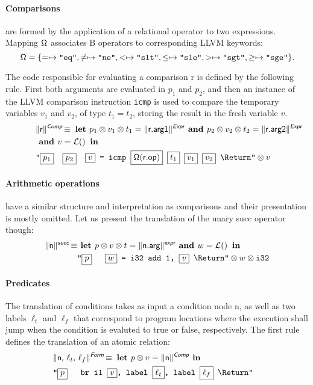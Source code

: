 \documentclass{llncs}
\newcommand{\trad}[2]{\ensuremath{\lVert \textsf{#1} \rVert^{\textit{#2}}}}
\newcommand{\nl}[0]{\text{\Return}}
\DeclareMathOperator{\isdef}{\equiv}
\DeclareMathOperator{\name}{\mathcal{L}()}
\newcommand{\llvm}[1]{\texttt{#1}}
\newcommand{\B}[1]{\textsf{#1}}
\newcommand{\LET}[0]{\textbf{ let }}
\newcommand{\IN}[0]{\textbf{ in }}
\newcommand{\AND}[0]{\textbf{ and }}
\newcommand{\PH}[1]{\framebox{$#1$}}
\newcommand{\sep}[0]{\otimes}
\newcommand{\opmap}[0]{\ensuremath{\sf\Omega}}
\begin{document}
\paragraph{Comparisons} are formed by the application of a relational operator
to two expressions. Mapping $\opmap$ associates B operators to corresponding
LLVM keywords:
$$\opmap = \{ = \mapsto \llvm{"eq"}, 
  \ne \mapsto \llvm{"ne"}, 
  < \mapsto \llvm{"slt"}, 
  \le \mapsto \llvm{"sle"}, 
  > \mapsto \llvm{"sgt"}, 
  \ge \mapsto \llvm{"sge"} \}.
$$

The code responsible for evaluating a comparison \B{r} is defined by the
following rule. First both arguments are evaluated in $p_1$ and $p_2$, and then
an instance of the LLVM comparison instruction \llvm{icmp} is used to compare
the temporary variables $v_1$ and $v_2$, of type $t_1 = t_2$, storing the result
in the fresh variable $v$.
\begin{align*}
\lefteqn{\trad{r}{\B{Comp}} \isdef
  \LET
  p_1 \sep v_1 \sep t_1 = \trad{r.arg1}{\B{Expr}} \AND
  p_2 \sep v_2 \sep t_2 = \trad{r.arg2}{\B{Expr}}} \\
& \AND v = \name \IN \\
& \llvm{"\PH{p_1}\quad\PH{p_2}\quad\PH{v} = icmp \PH{\opmap(\B{r.op})} \PH{t_1} \PH{v_1} \PH{v_2} \nl"} \sep v
\end{align*}
   
\paragraph{Arithmetic operations} have a similar structure and interpretation
as comparisons and their presentation is mostly omitted. Let us present the
translation of the unary \B{succ} operator though:
\begin{align*}
  \trad{n}{\B{succ}} \isdef & \textbf{ let } p \sep v \sep t =
  \trad{n.arg}{\B{expr}} \AND w = \name \IN \\
  & \llvm{"\PH{p} \quad \PH{w} = i32 add 1, \PH{v} \nl"} \sep w \sep \llvm{i32}
\end{align*}

\paragraph{Predicates}
The translation of conditions takes as input a condition node \B{n}, as well as
two labels $\ell_t$ and $\ell_f$ that correspond to program locations where the
execution shall jump when the condition is evaluted to true or false,
respectively.  The first rule defines the translation of an atomic relation:
\begin{align*}
  \lefteqn{\trad{n, $\ell_t$, $\ell_f$}{\B{Form}} \isdef
  \textbf{ let } p \sep v = \trad{n}{\B{Comp}} \IN} \\
  & \llvm{"\PH{p} \quad br i1 \PH{v}, label \PH{\ell_t}, label \PH{\ell_f} \nl"}
\end{align*}
\end{document}
